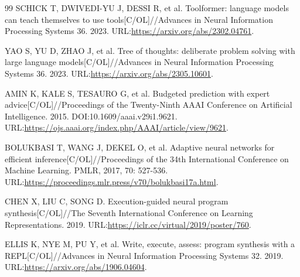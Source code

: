 \begin{thebibliography}{99}
SCHICK T, DWIVEDI-YU J, DESSI R, et al.
Toolformer: language models can teach themselves to use tools[C/OL]//Advances in Neural Information Processing Systems 36.
2023.
URL:\url{https://arxiv.org/abs/2302.04761}.

YAO S, YU D, ZHAO J, et al.
Tree of thoughts: deliberate problem solving with large language models[C/OL]//Advances in Neural Information Processing Systems 36.
2023.
URL:\url{https://arxiv.org/abs/2305.10601}.

AMIN K, KALE S, TESAURO G, et al.
Budgeted prediction with expert advice[C/OL]//Proceedings of the Twenty-Ninth AAAI Conference on Artificial Intelligence.
2015.
DOI:10.1609/aaai.v29i1.9621.
URL:\url{https://ojs.aaai.org/index.php/AAAI/article/view/9621}.

BOLUKBASI T, WANG J, DEKEL O, et al.
Adaptive neural networks for efficient inference[C/OL]//Proceedings of the 34th International Conference on Machine Learning.
PMLR, 2017, 70: 527-536.
URL:\url{https://proceedings.mlr.press/v70/bolukbasi17a.html}.

CHEN X, LIU C, SONG D.
Execution-guided neural program synthesis[C/OL]//The Seventh International Conference on Learning Representations.
2019.
URL:\url{https://iclr.cc/virtual/2019/poster/760}.

ELLIS K, NYE M, PU Y, et al.
Write, execute, assess: program synthesis with a REPL[C/OL]//Advances in Neural Information Processing Systems 32.
2019.
URL:\url{https://arxiv.org/abs/1906.04604}.

\end{thebibliography}

